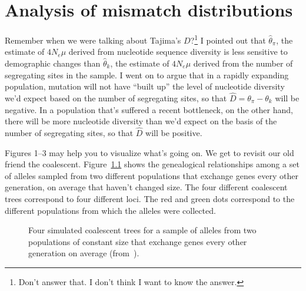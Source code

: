 \chapter{Analysis of mismatch distributions}

Remember when we were talking about Tajima's $D$?\footnote{Don't
  answer that. I don't think I want to know the answer.} I pointed out
that $\hat \theta_\pi$, the estimate of $4N_e\mu$ derived from
nucleotide sequence diversity is less sensitive to demographic changes
than $\hat \theta_k$, the estimate of $4N_e\mu$ derived from the
number of segregating sites in the sample. I went on to argue that in
a rapidly expanding population, mutation will not have ``built up''
the level of nucleotide diversity we'd expect based on the number of
segregating sites, so that $\hat D = \theta_\pi - \theta_k$ will be
negative. In a population that's suffered a recent bottleneck, on the
other hand, there will be more nucleotide diversity than we'd expect
on the basis of the number of segregating sites, so that $\hat D$ will
be positive.

Figures 1--3 may help you to visualize what's going on. We get to
revisit our old friend the
coalescent. Figure~\ref{fig:coalescent-constant} shows the genealogical
relationships among a set of alleles sampled from two different
populations that exchange genes every other generation, on average
that haven't changed size. The four different coalescent trees
correspond to four different loci. The red and green dots correspond
to the different populations from which the alleles were collected.

\begin{figure}
\begin{center}
\end{center}
\caption{Four simulated coalescent trees for a sample of alleles from
  two populations of constant size that exchange genes every other
  generation on average (from~\cite{Harpending-etal-1998}).}\label{fig:coalescent-constant}
\end{figure}

